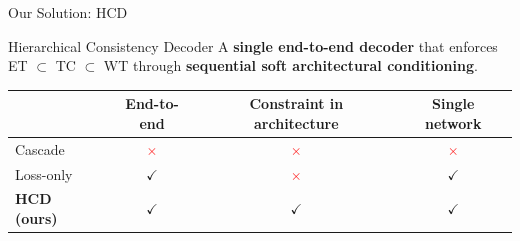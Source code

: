 \documentclass[aspectratio=169]{beamer}
\begin{document}
\begin{frame}{Our Solution: HCD}
  \vspace{0.5em}
  \begin{block}{Hierarchical Consistency Decoder}
    A \textbf{single end-to-end decoder} that enforces ET $\subset$ TC $\subset$ WT
    through \textbf{sequential soft architectural conditioning}.
  \end{block}

  \vspace{1em}
  \begin{center}
  \small
  \begin{tabular}{lccc}
    \toprule
    & \textbf{End-to-end} & \textbf{Constraint in architecture} & \textbf{Single network} \\
    \midrule
    Cascade       & \textcolor{red}{$\times$}                & \textcolor{red}{$\times$}                & \textcolor{red}{$\times$} \\
    Loss-only     & \textcolor{green!50!black}{$\checkmark$} & \textcolor{red}{$\times$}                & \textcolor{green!50!black}{$\checkmark$} \\
    \textbf{HCD (ours)} & \textcolor{green!50!black}{$\checkmark$} & \textcolor{green!50!black}{$\checkmark$} & \textcolor{green!50!black}{$\checkmark$} \\
    \bottomrule
  \end{tabular}
  \end{center}
\end{frame}
\end{document}
